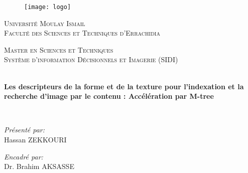 \documentclass[
openany,
11pt, %
french, %
singlespacing, %
headsepline, %
]{MastersDoctoralThesis} %
\author{John \textsc{Smith}} %
\begin{document}

\pagestyle{plain} %


\begin{titlepage}
\begin{center}

\begin{figure}[H]
	\centering
	\texttt{[image: logo]}
\end{figure}
{\scshape\LARGE Université Moulay Ismail \\
	Faculté des Sciences et Techniques d’Errachidia \par}\vspace{1.5cm} %

\textsc{\Large Master en Sciences et Techniques \\ Système d’information Décisionnels et Imagerie (SIDI)}\\[0.5cm] %

\HRule \\[0.4cm] %
{\huge \bfseries Les descripteurs de la forme et de la texture pour l’indexation et la recherche d’image par le contenu : Accélération par M-tree \par}\vspace{0.4cm} %
\HRule \\[1.5cm] %
 
\begin{minipage}[t]{0.4\textwidth}
\begin{flushleft} \large
\emph{Présenté par:}\\
Hassan ZEKKOURI
\end{flushleft}
\end{minipage}
\begin{minipage}[t]{0.4\textwidth}
\begin{flushright} \large
\emph{Encadré par:} \\
Dr. Brahim AKSASSE
\end{flushright}
\end{minipage}\\[3cm]
 

\end{center}
\end{titlepage}
\end{document}
